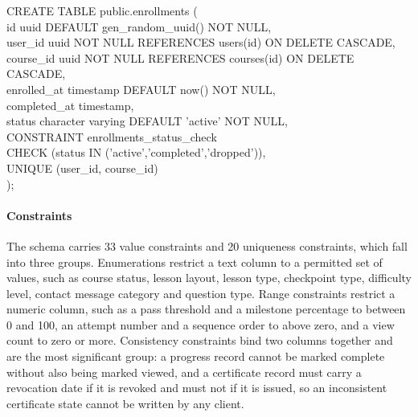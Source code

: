 \documentclass[12pt, oneside]{article} %
\begin{document}
\begin{tcolorbox}[listing only, breakable, boxsep=2pt, left=2pt, right=2pt]
\footnotesize\ttfamily
CREATE TABLE public.enrollments ( \\
\hspace*{4mm}id uuid DEFAULT gen\_random\_uuid() NOT NULL, \\
\hspace*{4mm}user\_id uuid NOT NULL REFERENCES users(id) ON DELETE CASCADE, \\
\hspace*{4mm}course\_id uuid NOT NULL REFERENCES courses(id) ON DELETE CASCADE, \\
\hspace*{4mm}enrolled\_at timestamp DEFAULT now() NOT NULL, \\
\hspace*{4mm}completed\_at timestamp, \\
\hspace*{4mm}status character varying DEFAULT 'active' NOT NULL, \\
\hspace*{4mm}CONSTRAINT enrollments\_status\_check \\
\hspace*{8mm}CHECK (status IN ('active','completed','dropped')), \\
\hspace*{4mm}UNIQUE (user\_id, course\_id) \\
);
\end{tcolorbox}

\paragraph{Constraints}

The schema carries 33 value constraints and 20 uniqueness constraints, which fall into three groups. Enumerations restrict a text column to a permitted set of values, such as course status, lesson layout, lesson type, checkpoint type, difficulty level, contact message category and question type. Range constraints restrict a numeric column, such as a pass threshold and a milestone percentage to between 0 and 100, an attempt number and a sequence order to above zero, and a view count to zero or more. Consistency constraints bind two columns together and are the most significant group: a progress record cannot be marked complete without also being marked viewed, and a certificate record must carry a revocation date if it is revoked and must not if it is issued, so an inconsistent certificate state cannot be written by any client.
\end{document}
